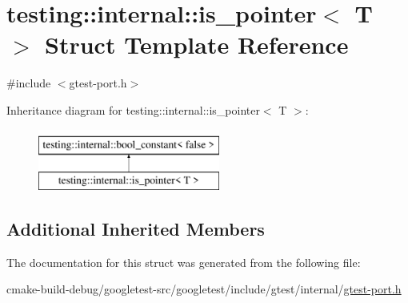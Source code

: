 \hypertarget{structtesting_1_1internal_1_1is__pointer}{}\section{testing\+::internal\+::is\+\_\+pointer$<$ T $>$ Struct Template Reference}
\label{structtesting_1_1internal_1_1is__pointer}


{\ttfamily \#include $<$gtest-\/port.\+h$>$}

Inheritance diagram for testing\+::internal\+::is\+\_\+pointer$<$ T $>$\+:\begin{figure}[H]
\begin{center}
\leavevmode
\includegraphics[height=2.000000cm]{structtesting_1_1internal_1_1is__pointer}
\end{center}
\end{figure}
\subsection*{Additional Inherited Members}


The documentation for this struct was generated from the following file\+:\begin{DoxyCompactItemize}
\item 
cmake-\/build-\/debug/googletest-\/src/googletest/include/gtest/internal/\mbox{\hyperlink{gtest-port_8h}{gtest-\/port.\+h}}\end{DoxyCompactItemize}
